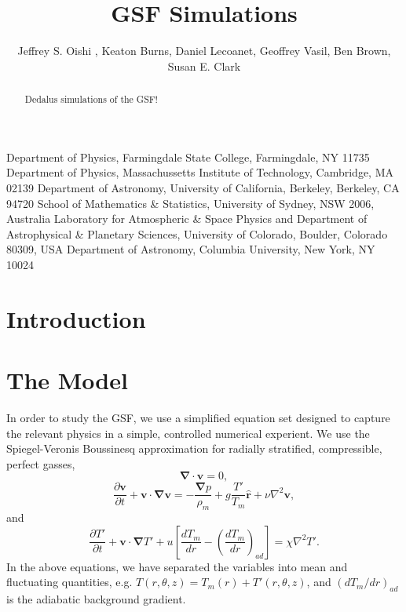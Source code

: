 \documentclass{jfm}
\begin{document}
\newtheorem{lemma}{Lemma}
\newtheorem{corollary}{Corollary}


\title{GSF Simulations}

\author
 {
 Jeffrey S. Oishi
  ,
  Keaton Burns,
  Daniel Lecoanet,
  Geoffrey Vasil,
  Ben Brown,
  Susan E. Clark
  }

\affiliation
{
Department of Physics, Farmingdale State College, Farmingdale, NY 11735
Department of Physics, Massachussetts Institute of Technology, Cambridge, MA 02139
Department of Astronomy, University of California, Berkeley, Berkeley, CA 94720
School of Mathematics \& Statistics, University of Sydney, NSW 2006, Australia
Laboratory for Atmospheric \& Space Physics and Department of Astrophysical \& Planetary Sciences, University of Colorado, Boulder, Colorado 80309, USA
Department of Astronomy, Columbia University, New York, NY 10024

}

\maketitle

\begin{abstract}
Dedalus simulations of the GSF!
\end{abstract}

\section{Introduction}
\label{sec:intro}

\section{The Model}
\label{sec:model}

In order to study the GSF, we use a simplified equation set designed
to capture the relevant physics in a simple, controlled numerical
experient. We use the Spiegel-Veronis Boussinesq approximation for
radially stratified, compressible, perfect gasses,
\begin{equation}
  \label{eq:continuity}
  \mathbf{\nabla \cdot v} = 0,
\end{equation}
\begin{equation}
  \label{eq:momentum}
  \frac{\partial \mathbf{v}}{\partial t} + \mathbf{v \cdot \nabla v} = -\frac{\mathbf{\nabla} p}{\rho_m} + g \frac{T'}{T_m}\mathbf{\hat{r}} + \nu \nabla^2 \mathbf{v},
\end{equation}
and
\begin{equation}
  \label{eq:temp}
  \frac{\partial T'}{\partial t} + \mathbf{v \cdot \nabla} T' + u \left[\frac{d T_m}{dr} - \left(\frac{d T_m}{dr}\right)_{ad}\right] = \chi \nabla^2 T'.
\end{equation}
In the above equations, we have separated the variables into mean and
fluctuating quantities, e.g. $T(r, \theta, z) = T_m(r) + T'(r, \theta, z)$, and $(d T_m/dr)_{ad}$ is the
adiabatic background gradient.
\end{document}
